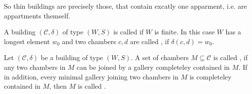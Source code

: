 So thin buildings are precisely those, that contain excatly one apparment, i.e. are appartments themself.

\begin{defi}
	A building $(\mathcal{C},\delta)$ of type $(W,S)$ is called  if $W$ is finite. In this case $W$ has a longest element $w_0$ and two chambers $c,d$ are called , if $\delta(c,d) = w_0$.
\end{defi}

\begin{defi}
	Let $(\mathcal{C},\delta)$ be a building of type $(W,S)$. A set of chambers $M \subseteq \mathcal{C}$ is called , if any two chambers in $M$ can be joined by a gallery completeley contained in $M$. If in addition, every minimal gallery joining two chambers in $M$ is completeley contained in $M$, then $M$ is called .
\end{defi}